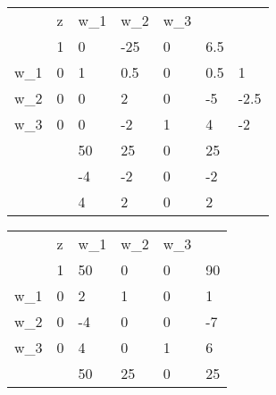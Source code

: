 \begin{tabular}{lllllll}
                          & z                      & w\_1                   & w\_2                    & w\_3                   &                         &      \\
                          & 1                      & 0                      & -25                     & 0                      & 6.5                     &      \\ \cline{2-6}
\multicolumn{1}{l|}{w\_1} &
  \multicolumn{1}{l|}{0} &
  \multicolumn{1}{l|}{1} &
  \multicolumn{1}{l|}{\cellcolor[HTML]{FE0000}0.5} &
  \multicolumn{1}{l|}{0} &
  \multicolumn{1}{l|}{0.5} &
  1 \\ \cline{2-6}
\multicolumn{1}{l|}{w\_2} & \multicolumn{1}{l|}{0} & \multicolumn{1}{l|}{0} & \multicolumn{1}{l|}{2}  & \multicolumn{1}{l|}{0} & \multicolumn{1}{l|}{-5} & -2.5 \\ \cline{2-6}
\multicolumn{1}{l|}{w\_3} & \multicolumn{1}{l|}{0} & \multicolumn{1}{l|}{0} & \multicolumn{1}{l|}{-2} & \multicolumn{1}{l|}{1} & \multicolumn{1}{l|}{4}  & -2   \\ \cline{2-6}
                          &                        & 50                     & 25                      & 0                      & 25                      &      \\
                          &                        & -4                     & -2                      & 0                      & -2                      &      \\
                          &                        & 4                      & 2                       & 0                      & 2                       &     
\end{tabular}

\begin{tabular}{llllll}
                          & z                      & w\_1                    & w\_2                   & w\_3                   &                         \\
                          & 1                      & 50                      & 0                      & 0                      & 90                      \\ \cline{2-6} 
\multicolumn{1}{l|}{w\_1} &
  \multicolumn{1}{l|}{0} &
  \multicolumn{1}{l|}{2} &
  \multicolumn{1}{l|}{\cellcolor[HTML]{FE0000}1} &
  \multicolumn{1}{l|}{0} &
  \multicolumn{1}{l|}{1} \\ \cline{2-6} 
\multicolumn{1}{l|}{w\_2} & \multicolumn{1}{l|}{0} & \multicolumn{1}{l|}{-4} & \multicolumn{1}{l|}{0} & \multicolumn{1}{l|}{0} & \multicolumn{1}{l|}{-7} \\ \cline{2-6} 
\multicolumn{1}{l|}{w\_3} & \multicolumn{1}{l|}{0} & \multicolumn{1}{l|}{4}  & \multicolumn{1}{l|}{0} & \multicolumn{1}{l|}{1} & \multicolumn{1}{l|}{6}  \\ \cline{2-6} 
                          &                        & 50                      & 25                     & 0                      & 25                     
\end{tabular}